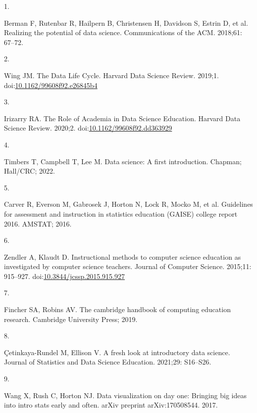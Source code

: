 \documentclass[
  10pt,
  letterpaper,
]{article}
\newlength{\cslhangindent}
\newlength{\csllabelwidth}
\newenvironment{CSLReferences}[2] %
 {\begin{list}{}{%
  \setlength{\itemindent}{0pt}
  \setlength{\leftmargin}{0pt}
  \setlength{\parsep}{0pt}
  \ifodd #1
   \setlength{\leftmargin}{\cslhangindent}
   \setlength{\itemindent}{-1\cslhangindent}
  \fi
  \setlength{\itemsep}{#2\baselineskip}}}
 {\end{list}}
\newcommand{\CSLLeftMargin}[1]{\parbox[t]{\csllabelwidth}{\strut#1\strut}}
\newcommand{\CSLRightInline}[1]{\parbox[t]{\linewidth - \csllabelwidth}{\strut#1\strut}}
\begin{document}
\label{refs}
\begin{CSLReferences}{0}{1}
\CSLLeftMargin{1. }%
\CSLRightInline{Berman F, Rutenbar R, Hailpern B, Christensen H,
Davidson S, Estrin D, et al. Realizing the potential of data science.
Communications of the ACM. 2018;61: 67--72. }

\CSLLeftMargin{2. }%
\CSLRightInline{Wing JM. The {Data} {Life} {Cycle}. Harvard Data Science
Review. 2019;1.
doi:\href{https://doi.org/10.1162/99608f92.e26845b4}{10.1162/99608f92.e26845b4}}

\CSLLeftMargin{3. }%
\CSLRightInline{Irizarry RA. {The Role of Academia in Data Science
Education}. Harvard Data Science Review. 2020;2.
doi:\href{https://doi.org/10.1162/99608f92.dd363929}{10.1162/99608f92.dd363929}}

\CSLLeftMargin{4. }%
\CSLRightInline{Timbers T, Campbell T, Lee M. Data science: A first
introduction. Chapman; Hall/CRC; 2022. }

\CSLLeftMargin{5. }%
\CSLRightInline{Carver R, Everson M, Gabrosek J, Horton N, Lock R, Mocko
M, et al. Guidelines for assessment and instruction in statistics
education (GAISE) college report 2016. AMSTAT; 2016. }

\CSLLeftMargin{6. }%
\CSLRightInline{Zendler A, Klaudt D. Instructional methods to computer
science education as investigated by computer science teachers. Journal
of Computer Science. 2015;11: 915--927.
doi:\href{https://doi.org/10.3844/jcssp.2015.915.927}{10.3844/jcssp.2015.915.927}}

\CSLLeftMargin{7. }%
\CSLRightInline{Fincher SA, Robins AV. The cambridge handbook of
computing education research. Cambridge University Press; 2019. }

\CSLLeftMargin{8. }%
\CSLRightInline{Çetinkaya-Rundel M, Ellison V. A fresh look at
introductory data science. Journal of Statistics and Data Science
Education. 2021;29: S16--S26. }

\CSLLeftMargin{9. }%
\CSLRightInline{Wang X, Rush C, Horton NJ. Data visualization on day
one: Bringing big ideas into intro stats early and often. arXiv preprint
arXiv:170508544. 2017. }


\end{CSLReferences}
\end{document}
